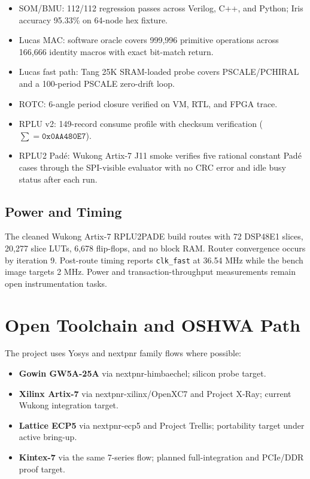 \documentclass[10pt,twocolumn]{article}
\begin{document}
\begin{itemize}
\item SOM/BMU: 112/112 regression passes across Verilog, C++, and Python;
  Iris accuracy 95.33\% on 64-node hex fixture.
\item Lucas MAC: software oracle covers 999,996 primitive operations across
  166,666 identity macros with exact bit-match return.\cite{lucas2026}
\item Lucas fast path: Tang 25K SRAM-loaded probe covers PSCALE/PCHIRAL and a
  100-period PSCALE zero-drift loop.
\item ROTC: 6-angle period closure verified on VM, RTL, and FPGA trace.
\item RPLU v2: 149-record consume profile with checksum verification
  ($\sum = \mathtt{0x0AA480E7}$).
\item RPLU2 Pad\'e: Wukong Artix-7 J11 smoke verifies five rational constant
  Pad\'e cases through the SPI-visible evaluator with no CRC error and idle
  busy status after each run.
\end{itemize}

\subsection{Power and Timing}
\label{sec:power}

The cleaned Wukong Artix-7 RPLU2PADE build routes with 72 DSP48E1 slices,
20,277 slice LUTs, 6,678 flip-flops, and no block RAM. Router convergence
occurs by iteration 9. Post-route timing reports \texttt{clk\_fast} at 36.54 MHz while
the bench image targets 2 MHz. Power and transaction-throughput measurements
remain open instrumentation tasks.

\section{Open Toolchain and OSHWA Path}
\label{sec:toolchain}

The project uses Yosys\cite{yosys} and nextpnr\cite{nextpnr} family flows
where possible:

\begin{itemize}
\item \textbf{Gowin GW5A-25A} via nextpnr-himbaechel; silicon probe target.
\item \textbf{Xilinx Artix-7} via nextpnr-xilinx/OpenXC7 and Project X-Ray;
  current Wukong integration target.
\item \textbf{Lattice ECP5} via nextpnr-ecp5 and Project Trellis; portability
  target under active bring-up.
\item \textbf{Kintex-7} via the same 7-series flow; planned full-integration
  and PCIe/DDR proof target.
\end{itemize}
\end{document}

